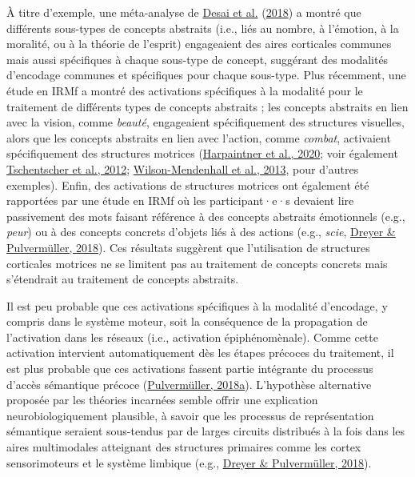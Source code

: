 \documentclass[
  a4paper,12pt,twoside,onecolumn,openright,final,oldfontcommands]{memoir}
\begin{document}
À titre d'exemple, une méta-analyse de \protect\hyperlink{ref-desai_multifaceted_2018}{Desai et al.} (\protect\hyperlink{ref-desai_multifaceted_2018}{2018}) a montré que différents sous-types de concepts abstraits (i.e., liés au nombre, à l'émotion, à la moralité, ou à la théorie de l'esprit) engageaient des aires corticales communes mais aussi spécifiques à chaque sous-type de concept, suggérant des modalités d'encodage communes et spécifiques pour chaque sous-type. Plus récemment, une étude en IRMf a montré des activations spécifiques à la modalité pour le traitement de différents types de concepts abstraits ; les concepts abstraits en lien avec la vision, comme \emph{beauté}, engageaient spécifiquement des structures visuelles, alors que les concepts abstraits en lien avec l'action, comme \emph{combat}, activaient spécifiquement des structures motrices (\protect\hyperlink{ref-harpaintner_grounding_2020}{Harpaintner et al., 2020}; voir également \protect\hyperlink{ref-tschentscher_you_2012}{Tschentscher et al., 2012}; \protect\hyperlink{ref-wilson-mendenhall_contextual_2013}{Wilson-Mendenhall et al., 2013}, pour d'autres exemples). Enfin, des activations de structures motrices ont également été rapportées par une étude en IRMf où les participant·e·s devaient lire passivement des mots faisant référence à des concepts abstraits émotionnels (e.g., \emph{peur}) ou à des concepts concrets d'objets liés à des actions (e.g., \emph{scie}, \protect\hyperlink{ref-dreyer_abstract_2018}{Dreyer \& Pulvermüller, 2018}). Ces résultats suggèrent que l'utilisation de structures corticales motrices ne se limitent pas au traitement de concepts concrets mais s'étendrait au traitement de concepts abstraits.

Il est peu probable que ces activations spécifiques à la modalité d'encodage, y compris dans le système moteur, soit la conséquence de la propagation de l'activation dans les réseaux (i.e., activation épiphénomènale). Comme cette activation intervient automatiquement dès les étapes précoces du traitement, il est plus probable que ces activations fassent partie intégrante du processus d'accès sémantique précoce (\protect\hyperlink{ref-pulvermuller_neural_2018}{Pulvermüller, 2018a}). L'hypothèse alternative proposée par les théories incarnées semble offrir une explication neurobiologiquement plausible, à savoir que les processus de représentation sémantique seraient sous-tendus par de larges circuits distribués à la fois dans les aires multimodales atteignant des structures primaires comme les cortex sensorimoteurs et le système limbique (e.g., \protect\hyperlink{ref-dreyer_abstract_2018}{Dreyer \& Pulvermüller, 2018}).
\end{document}
